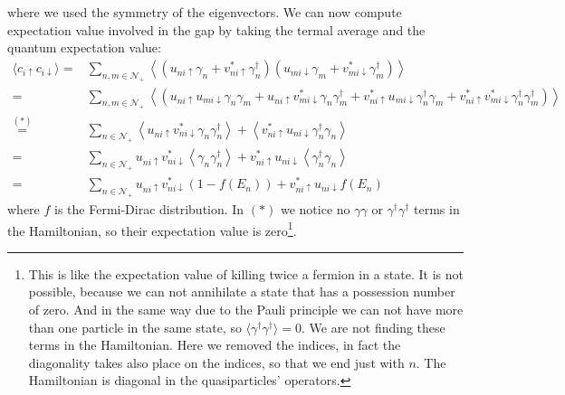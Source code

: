 \documentclass[../main.tex]{subfile}
\begin{document}
where we used the symmetry of the eigenvectors. We can now compute expectation value involved in the gap by taking the termal average and the quantum expectation value:
\begin{equation}\label{eq:transfo_c_up_c_down_BdG}
\begin{aligned}
    \langle c_{i\uparrow}c_{i\downarrow} \rangle =& \sum_{n,m\in\mathcal{N}_+} \left\langle\left(u_{ni\uparrow}\gamma_n + v_{ni\uparrow}^{\ast}\gamma_{n}^{\dagger}\right)\left(u_{mi\downarrow}\gamma_m + v_{mi\downarrow}^{\ast}\gamma_{m}^{\dagger}\right)\right\rangle\\
     =&  \sum_{n,m\in\mathcal{N}_+} \left\langle\left(u_{ni\uparrow} u_{mi\downarrow}\gamma_n\gamma_m + u_{ni\uparrow} v_{mi\downarrow}^{\ast}\gamma_n\gamma_{m}^{\dagger} + v_{ni\uparrow}^{\ast}u_{mi\downarrow}\gamma_{n}^{\dagger} \gamma_m+  v_{ni\uparrow}^{\ast} v_{mi\downarrow}^{\ast}\gamma_{n}^{\dagger}\gamma_{m}^{\dagger}  \right)\right\rangle\\
     \stackrel{(\ast)}{=}&  \sum_{n\in\mathcal{N}_+} \left\langle u_{ni\uparrow} v_{ni\downarrow}^{\ast}\gamma_n\gamma_{n}^{\dagger}\right\rangle + \left\langle v_{ni\uparrow}^{\ast}u_{ni\downarrow}\gamma_{n}^{\dagger}\gamma_{n}\right\rangle\\     
     =&  \sum_{n\in\mathcal{N}_+} u_{ni\uparrow} v_{ni\downarrow}^{\ast}\left\langle\gamma_n\gamma_{n}^{\dagger}\right\rangle + v_{ni\uparrow}^{\ast}u_{ni\downarrow}\left\langle \gamma_{n}^{\dagger}\gamma_{n}\right\rangle\\
     =&  \sum_{n\in\mathcal{N}_+} u_{ni\uparrow} v_{ni\downarrow}^{\ast} \left(1-f(E_n)\right) + v_{ni\uparrow}^{\ast}u_{ni\downarrow}f(E_n)
\end{aligned}
\end{equation}
where $f$ is the Fermi-Dirac distribution. In $(\ast)$ we notice no $\gamma\gamma$ or $\gamma^{\dagger}\gamma^{\dagger}$ terms in the Hamiltonian, so their expectation 
value is zero\footnote{This is like the expectation value of killing twice a fermion in a state. It is not possible, because we can not annihilate a state that has a possession number of zero.
And in the same way due to the Pauli principle we can not have more than one particle in the same state, so $\langle \gamma^{\dagger} \gamma^{\dagger} \rangle = 0$. We are not 
finding these terms in the Hamiltonian. Here we removed the indices, in fact the diagonality takes also place on the indices, so that we end just with $n$.
The Hamiltonian is diagonal in the quasiparticles' operators.}.
\end{document}
